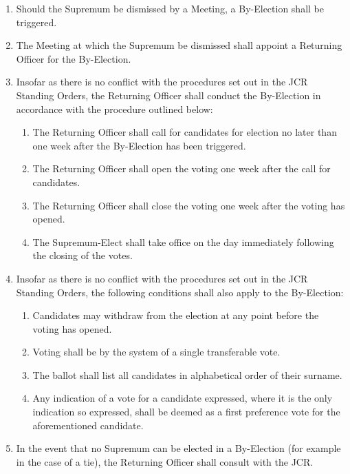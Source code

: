 \documentclass[pdftex,a4paper]{report}
\begin{document}
\begin{enumerate}[label=\Roman*)]
	\item Should the Supremum be dismissed by a Meeting, a By-Election shall be triggered.
	\item The Meeting at which the Supremum be dismissed shall appoint a Returning Officer for the By-Election.
	\item Insofar as there is no conflict with the procedures set out in the JCR Standing Orders, the Returning Officer shall conduct the By-Election in accordance with the procedure outlined below:
	\begin{enumerate}[label=\roman*)]
		\item The Returning Officer shall call for candidates for election no later than one week after the By-Election has been triggered.
		\item The Returning Officer shall open the voting one week after the call for candidates.
		\item The Returning Officer shall close the voting one week after the voting has opened.
		\item The Supremum-Elect shall take office on the day immediately following the closing of the votes.
	\end{enumerate}
	\item Insofar as there is no conflict with the procedures set out in the JCR Standing Orders, the following conditions shall also apply to the By-Election:
	\begin{enumerate}[label=\roman*)]
		\item Candidates may withdraw from the election at any point before the voting has opened.
		\item Voting shall be by the system of a single transferable vote. 
		\item The ballot shall list all candidates in alphabetical order of their surname.
		\item Any indication of a vote for a candidate expressed, where it is the only indication so expressed, shall be deemed as a first preference vote for the aforementioned candidate.
	\end{enumerate}
	\item In the event that no Supremum can be elected in a By-Election (for example in the case of a tie), the Returning Officer shall consult with the JCR.
\end{enumerate}
\end{document}
